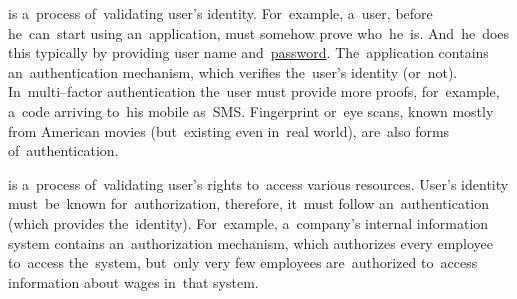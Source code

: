 \label{authenticationauthorization}
\begin{itemize}
     is a~process of~validating user's identity.
            For~example, a~user, before he~can~start using an~application, must somehow prove who~he~is.
            And~he~does this typically by providing user name and~\hyperref[keypassword]{password}.
            The~application contains an~authentication mechanism, which verifies the~user's identity (or~not).
            In~multi--factor authentication the~user must provide more proofs, for~example, a~code arriving to~his mobile as~SMS.
            Fingerprint or~eye scans, known mostly from American movies (but~existing even in~real world), are~also forms of~authentication.
\end{itemize}
\newpage

\begin{itemize}
     is a~process of~validating user's rights to~access various resources.
            User's identity must~be~known for~authorization, therefore, it~must follow an~authentication (which provides the~identity).
            For~example, a~company's internal information system contains an~authorization mechanism, which authorizes every employee to~access the~system, but~only very few employees are~authorized to~access information about wages in~that system.
\end{itemize}
